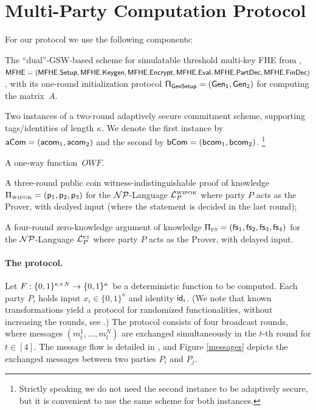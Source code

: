 \section{Multi-Party Computation Protocol}\label{s:2PC}
For our protocol we use the following components: 
\BI
\item
The ``dual''-GSW-based scheme for simulatable threshold multi-key FHE from , ${\mathsf{MFHE}} =({\mathsf{MFHE.Setup}},\mathsf{MFHE.Keygen},{\mathsf{MFHE.Encrypt}},{\mathsf{MFHE.Eval}},\\{\mathsf{MFHE.PartDec}},{\mathsf{MFHE.FinDec}})$, with its one-round initialization protocol $\sf \Pi_{GenSetup}=({\sf Gen_1},{\sf Gen_2})$ for computing the matrix~$A$.

\item
  Two instances of a two-round adaptively secure commitment scheme, supporting tags/identities of length $\kappa$. We denote the first instance by $\mathsf{aCom}=(\mathsf{acom}_1,\mathsf{acom}_2)$ and the second by $\mathsf{bCom}=({\mathsf{bcom}}_1,{\mathsf{bcom}}_2)$.%
\footnote{Strictly speaking we do not need the second instance to be adaptively secure, but it is convenient to use the same scheme for both instances.
}

\item A one-way function~$OWF$.

\item A three-round public coin witness-indistinguishable proof of knowledge $\Pi_{\scriptscriptstyle\mathrm{WIPOK}}=(\mathsf{p}_1, \mathsf{p}_2, \mathsf{p}_3)$ for the ${{\cal NP}}$-Language ${{\cal L}^{\scriptscriptstyle\mathrm{WIPOK}}_{P}}$ where party $P$ acts as the Prover, with dealyed input (where the statement is decided in the last round);

\item A four-round zero-knowledge argument of knowledge $\Pi_{\scriptscriptstyle\mathrm{FS}}=(\mathsf{fs}_1, \mathsf{fs}_2, \mathsf{fs}_3,\mathsf{fs}_4)$ for  the ${{\cal NP}}$-Language ${{{\mathsf{{\cal L}}}^{{\scriptscriptstyle\mathrm{FS}}}_{P}}}$ where party $P$ acts as the Prover, with delayed input.
\EI

\paragraph{The protocol.}
Let $F: \{0,1\}^{\kappa \times N} \rightarrow \{0,1\}^\kappa$ be a deterministic function to be computed. Each party $P_i$ holds input $x_i \in \{0,1\}^\kappa$ and identity $\mathsf{id}_i$. (We note that known transformations yield a protocol for randomized functionalities, without increasing the rounds, see \cite[Section 7.3]{Goldreich04}.)
The protocol consists of four broadcast rounds, where messages $(m_t^1,\ldots, m^N_t)$ are exchanged simultaneously in the $t$-th round for $t\in[4]$. The message flow is detailed in , and Figure \ref{messages} depicts the exchanged messages between two parties $P_i$ and $P_j$.


